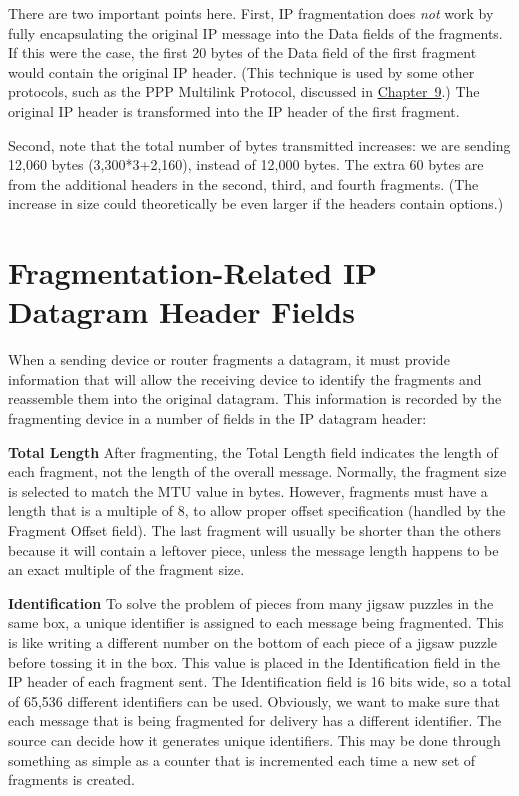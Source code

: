 There are two important points here. First, IP fragmentation does
{\emph{not}} work by fully encapsulating the original IP message into
the Data fields of the fragments. If this were the case, the first 20
bytes of the Data field of the first fragment would contain the original
IP header. (This technique is used by some other protocols, such as the
PPP Multilink Protocol, discussed in
\protect\hyperlink{ch09.html}{Chapter~9}.) The original IP header is
transformed into the IP header of the first fragment.

Second, note that the total number of bytes transmitted increases: we
are sending 12,060 bytes (3,300*3+2,160), instead of 12,000 bytes. The
extra 60 bytes are from the additional headers in the second, third, and
fourth fragments. (The increase in size could theoretically be even
larger if the headers contain options.)



\section{Fragmentation-Related IP Datagram Header Fields}

\protect\hypertarget{ch22s02.htmlux5cux23idx-CHP-22-0809}{}{}When a
sending device or router fragments a datagram, it must provide
information that will allow the receiving device to identify the
fragments and reassemble them into the original datagram. This
information is recorded by the fragmenting device in a number of fields
in the IP datagram header:

{\textbf{Total Length}} After fragmenting, the
\protect\hypertarget{ch22s02.htmlux5cux23idx-CHP-22-0810}{}{}Total
Length field indicates the length of each fragment, not the length of
the overall message. Normally, the fragment size is selected to match
the MTU value in bytes. However, fragments must have a length that is a
multiple of 8, to allow proper offset specification (handled by the
Fragment Offset field). The last fragment will usually be shorter than
the others because it will contain a leftover piece, unless the message
length happens to be an exact multiple of the fragment size.

{\textbf{Identification}} To solve the problem of pieces from many
jigsaw puzzles in the same box, a unique identifier is assigned to each
message being fragmented. This is like writing a different number on the
bottom of each piece of a jigsaw puzzle before tossing it in the box.
This value is placed in the Identification field in the IP header of
each fragment sent. The Identification field is 16 bits wide, so a total
of 65,536 different identifiers can be used. Obviously, we want to make
sure that each message that is being fragmented for delivery has a
different identifier. The source can decide how it generates unique
identifiers. This may be done through something as simple as a counter
that is incremented each time a new set of fragments is created.

